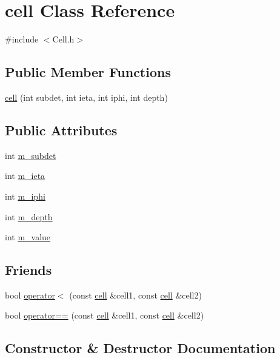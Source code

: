 \hypertarget{classcell}{}\section{cell Class Reference}
\label{classcell}


{\ttfamily \#include $<$Cell.\+h$>$}

\subsection*{Public Member Functions}
\begin{DoxyCompactItemize}
\item 
\hyperlink{classcell_a0a97b024f22e2614adb16e7d95c18e46}{cell} (int subdet, int ieta, int iphi, int depth)
\end{DoxyCompactItemize}
\subsection*{Public Attributes}
\begin{DoxyCompactItemize}
\item 
int \hyperlink{classcell_a032a6f28cc331dbcc9bde99b1ddff042}{m\+\_\+subdet}
\item 
int \hyperlink{classcell_a5713cffee48ca71ff4c1819c5ed5b0eb}{m\+\_\+ieta}
\item 
int \hyperlink{classcell_ac9ffc40e1e156ea6db34bc26c7614aba}{m\+\_\+iphi}
\item 
int \hyperlink{classcell_a4630e40542df2a31653c1cb977c9c5a0}{m\+\_\+depth}
\item 
int \hyperlink{classcell_a8bdaee6cc850bfe6ef988c29888c7182}{m\+\_\+value}
\end{DoxyCompactItemize}
\subsection*{Friends}
\begin{DoxyCompactItemize}
\item 
bool \hyperlink{classcell_a5a0f55e4f9817dd3a41da31995adbb01}{operator$<$} (const \hyperlink{classcell}{cell} \&cell1, const \hyperlink{classcell}{cell} \&cell2)
\item 
bool \hyperlink{classcell_a03d2c0c74eb5f8600af921a087639759}{operator==} (const \hyperlink{classcell}{cell} \&cell1, const \hyperlink{classcell}{cell} \&cell2)
\end{DoxyCompactItemize}


\subsection{Constructor \& Destructor Documentation}
\hypertarget{classcell_a0a97b024f22e2614adb16e7d95c18e46}{}
